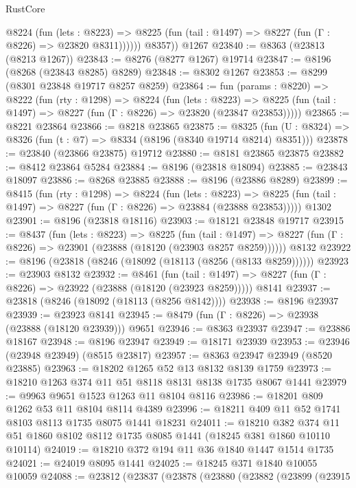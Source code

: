 \begin{lexlean}{RustCore}
\begin{coremodule}
            @8224
              (fun (lets : @8223) =>
              @8225 (fun (tail : @1497) => @8227 (fun (Γ : @8226) => @23820 @8311))))))
        @8357))
    @1267
@23840 := @8363 (@23813 (@8213 @1267))
@23843 := @8276 (@8277 @1267) @19714
@23847 := @8196 (@8268 (@23843 @8285) @8289)
@23848 := @8302 @1267
@23853 := @8299 (@8301 @23848 @19717 @8257 @8259)
@23864 := fun (params : @8220) =>
  @8222
    (fun (rty : @1298) =>
    @8224
      (fun (lets : @8223) =>
      @8225 (fun (tail : @1497) => @8227 (fun (Γ : @8226) => @23820 (@23847 @23853)))))
@23865 := @8221 @23864
@23866 := @8218 @23865
@23875 := @8325
    (fun (U : @8324) => @8326 (fun (t : @7) => @8334 (@8196 (@8340 @19714 @8214) @8351)))
@23878 := @23840 (@23866 @23875) @19712
@23880 := @8181 @23865 @23875
@23882 := @8412 @23864 @5284
@23884 := @8196 (@23818 @18094)
@23885 := @23843 @18097
@23886 := @8268 @23885
@23888 := @8196 (@23886 @8289)
@23899 := @8415
    (fun (rty : @1298) =>
    @8224
      (fun (lets : @8223) =>
      @8225 (fun (tail : @1497) => @8227 (fun (Γ : @8226) => @23884 (@23888 @23853)))))
    @1302
@23901 := @8196 (@23818 @18116)
@23903 := @18121 @23848 @19717
@23915 := @8437
    (fun (lets : @8223) =>
    @8225
      (fun (tail : @1497) =>
      @8227 (fun (Γ : @8226) => @23901 (@23888 (@18120 (@23903 @8257 @8259))))))
    @8132
@23922 := @8196 (@23818 (@8246 (@18092 (@18113 (@8256 (@8133 @8259))))))
@23923 := @23903 @8132
@23932 := @8461
    (fun (tail : @1497) => @8227 (fun (Γ : @8226) => @23922 (@23888 (@18120 (@23923 @8259)))))
    @8141
@23937 := @23818 (@8246 (@18092 (@18113 (@8256 @8142))))
@23938 := @8196 @23937
@23939 := @23923 @8141
@23945 := @8479 (fun (Γ : @8226) => @23938 (@23888 (@18120 @23939))) @9651
@23946 := @8363 @23937
@23947 := @23886 @18167
@23948 := @8196 @23947
@23949 := @18171 @23939
@23953 := @23946 (@23948 @23949) (@8515 @23817)
@23957 := @8363 @23947 @23949 (@8520 @23885)
@23963 := @18202 @1265 @52 @13 @8132 @8139 @1759
@23973 := @18210 @1263 @374 @11 @51 @8118 @8131 @8138 @1735 @8067 @1441
@23979 := @9963 @9651 @1523 @1263 @11 @8104 @8116
@23986 := @18201 @809 @1262 @53 @11 @8104 @8114 @4389
@23996 := @18211 @409 @11 @52 @1741 @8103 @8113 @1735 @8075 @1441 @18231
@24011 := @18210
    @382
    @374
    @11
    @51
    @1860
    @8102
    @8112
    @1735
    @8085
    @1441
    (@18245 @381 @1860 @10110 @10114)
@24019 := @18210 @372 @194 @11 @36 @1840 @1447 @1514 @1735
@24021 := @24019 @8095 @1441
@24025 := @18245 @371 @1840 @10055 @10059
@24088 := @23812
    (@23837
      (@23878
        (@23880
          (@23882
            (@23899
              (@23915

\end{coremodule}
\end{lexlean}
